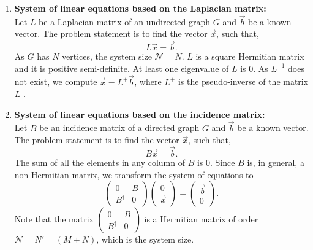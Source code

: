 \documentclass[%
 reprint,
 superscriptaddress,
 amsmath,amssymb,
 aps,
 pra,
floatfix,
nofootinbib,
]{revtex4-2}
\theoremstyle{definition}
\theoremstyle{remark}
\begin{document}
\begin{enumerate}
    \item 
        \textbf{System of linear equations based on the Laplacian matrix: }\\
        Let $L$ be a Laplacian matrix of an undirected graph $G$ and $\vec{b}$ be a known vector. The problem statement is to find the vector $\vec{x}$, such that, 
        \begin{equation} \label{eqn:lx=b}
            L \vec{x} = \vec{b}. 
        \end{equation}
        As $G$ has $N$ vertices, the system size $\mathcal{N} = N$. $L$ is a square Hermitian matrix and it is positive semi-definite. At least one eigenvalue of $L$ is $0$. As $L^{-1}$ does not exist, we compute $\vec{x} = L^{+}\vec{b}$, where $L^{+}$ is the pseudo-inverse of the matrix $L$ \cite{penrose1956best}.
    \item 
        \textbf{System of linear equations based on the incidence matrix: }\\
        Let $B$ be an incidence matrix of a directed graph $G$ and $\vec{b}$ be a known vector. The problem statement is to find the vector $\vec{x}$, such that, 
        \begin{equation} \label{eqn:Bx=b}
            B \vec{x} = \vec{b}. 
        \end{equation}
        The sum of all the elements in any column of $B$ is $0$. Since $B$ is, in general, a non-Hermitian matrix, we transform the system of equations to 
\begin{equation} \label{eqn:HX=C}
   \begin{pmatrix}
        0 & B \\
        B^{\dagger} & 0
    \end{pmatrix}
{\begin{pmatrix}
        0 \\
        \vec{x}
    \end{pmatrix}}
    = {\begin{pmatrix}
        \vec{b} \\
        0
    \end{pmatrix}}.
\end{equation} 
    Note that the matrix $ \begin{pmatrix}
        0 & B \\
        B^{\dagger} & 0
    \end{pmatrix}$ is a Hermitian matrix of order $\mathcal{N} = N'= (M + N)$, which is the system size.
\end{enumerate} 
\end{document}
